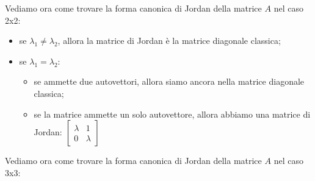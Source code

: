     Vediamo ora come trovare la forma canonica di Jordan della matrice $A$ nel caso 2x2:
    \begin{itemize}
        \item se $\lambda_1 \neq \lambda_2$, allora la matrice di Jordan è la matrice diagonale classica;
        \item se $\lambda_1 = \lambda_2$:
        \begin{itemize}
            \item se ammette due autovettori, allora siamo ancora nella matrice diagonale classica;
            \item se la matrice ammette un solo autovettore, allora abbiamo una matrice di Jordan: $\left[\begin{matrix}
                \lambda & 1\\ 0 & \lambda
            \end{matrix}\right]$
        \end{itemize}
    \end{itemize}
    Vediamo ora come trovare la forma canonica di Jordan della matrice $A$ nel caso 3x3:
